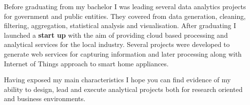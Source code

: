 \documentclass[11pt, a4paper]{awesome-cv}
\begin{document}
\begin{cvletter}

Before graduating from my bachelor I was leading several data analytics projects for government and public entities. They covered from data generation, cleaning, filtering, aggregation, statistical analysis and visualisation. After graduating I launched a \textbf{start up} with the aim of providing cloud based processing and analytical services for the local industry. Several projects were developed to generate web services for capturing information and later processing along with Internet of Things approach to smart home appliances. 

\vspace{1.2cm}
Having exposed my main characteristics I hope you can find evidence of my ability to design, lead and execute analytical projects both for research oriented and business environments. 



\end{cvletter}


\makeletterclosing
\end{document}
